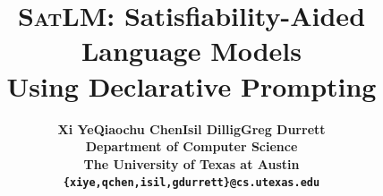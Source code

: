 \documentclass{article}
\title{\textsc{SatLM}: Satisfiability-Aided Language Models \\ Using Declarative Prompting}
\author{%
\bf Xi Ye\quad\quad Qiaochu Chen\quad\quad Isil Dillig\quad\quad Greg Durrett\\
  Department of Computer Science \\
  The University of Texas at Austin \\
  \texttt{\{xiye,qchen,isil,gdurrett\}@cs.utexas.edu} \\
  }
\theoremstyle{definition}
\begin{document}
\maketitle


\begin{abstract}



\end{abstract}
\end{document}
